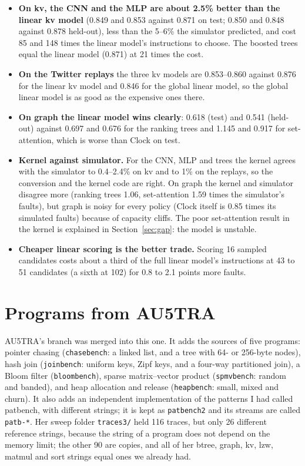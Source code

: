 \documentclass[10.5pt,a4paper]{article}
\newcommand{\code}[1]{\texttt{#1}}
\begin{document}
\begin{itemize}
\item \textbf{On kv, the CNN and the MLP are about 2.5\% better than the linear kv model} (0.849 and 0.853 against 0.871 on
  test; 0.850 and 0.848 against 0.878 held-out), less than the 5--6\% the simulator predicted, and cost 85 and 148 times the
  linear model's instructions to choose. The boosted trees equal the linear model (0.871) at 21 times the cost.
\item \textbf{On the Twitter replays} the three kv models are 0.853--0.860 against 0.876 for the linear kv model and 0.846 for
  the global linear model, so the global linear model is as good as the expensive ones there.
\item \textbf{On graph the linear model wins clearly}: 0.618 (test) and 0.541 (held-out) against 0.697 and 0.676 for the ranking trees
  and 1.145 and 0.917 for set-attention, which is worse than Clock on test.
\item \textbf{Kernel against simulator.} For the CNN, MLP and trees the kernel agrees with the simulator to 0.4--2.4\% on kv and
  to 1\% on the replays, so the conversion and the kernel code are right. On graph the kernel and simulator disagree more
  (ranking trees 1.06, set-attention 1.59 times the simulator's faults), but graph is noisy for every policy (Clock itself is 0.85
  times its simulated faults) because of capacity cliffs. The poor set-attention result in the kernel is explained in Section~\ref{sec:gap}: the model is unstable.
\item \textbf{Cheaper linear scoring is the better trade.} Scoring 16 sampled candidates costs about a third of the full linear model's
  instructions at 43 to 51 candidates (a sixth at 102) for 0.8 to 2.1 points more faults.
\end{itemize}

\section{Programs from AU5TRA}
\label{sec:austra}

AU5TRA's branch was merged into this one. It adds the sources of five programs: pointer chasing (\code{chasebench}: a linked list,
and a tree with 64- or 256-byte nodes), hash join (\code{joinbench}: uniform keys, Zipf keys, and a four-way partitioned
join), a Bloom filter (\code{bloombench}), sparse matrix--vector product (\code{spmvbench}: random and banded), and heap
allocation and release (\code{heapbench}: small, mixed and churn). It also adds an independent implementation of the patterns I had
called patbench, with different strings; it is kept as \code{patbench2} and its streams are called \code{patb-*}. Her sweep
folder \code{traces3/} held 116 traces, but only 26 different reference strings, because the string of a program does not depend on
the memory limit; the other 90 are copies, and all of her btree, graph, kv, lzw, matmul and sort strings equal ones we already had.
\end{document}
